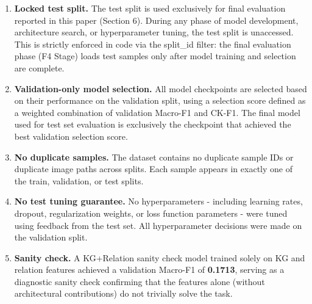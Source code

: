 \begin{enumerate}
    \item \textbf{Locked test split.} The test split is used exclusively for final evaluation reported in this paper (Section 6). During any phase of model development, architecture search, or hyperparameter tuning, the test split is unaccessed. This is strictly enforced in code via the split\_id filter: the final evaluation phase (F4 Stage) loads test samples only after model training and selection are complete.
    \item \textbf{Validation-only model selection.} All model checkpoints are selected based on their performance on the validation split, using a selection score defined as a weighted combination of validation Macro-F1 and CK-F1. The final model used for test set evaluation is exclusively the checkpoint that achieved the best validation selection score.
    \item \textbf{No duplicate samples.} The dataset contains no duplicate sample IDs or duplicate image paths across splits. Each sample appears in exactly one of the train, validation, or test splits.
    \item \textbf{No test tuning guarantee.} No hyperparameters - including learning rates, dropout, regularization weights, or loss function parameters - were tuned using feedback from the test set. All hyperparameter decisions were made on the validation split.
    \item \textbf{Sanity check.} A KG+Relation sanity check model trained solely on KG and relation features achieved a validation Macro-F1 of \textbf{0.1713}, serving as a diagnostic sanity check confirming that the features alone (without architectural contributions) do not trivially solve the task.
\end{enumerate}
